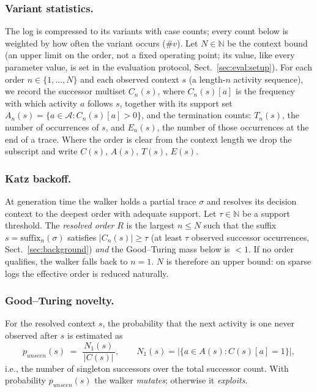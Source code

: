 \documentclass[runningheads]{llncs}
\newcommand{\punseen}{\ensuremath{p_{\mathit{unseen}}}}
\begin{document}
\subsubsection{Variant statistics.}
The log is compressed to its variants with case counts; every count below is weighted by how often the variant occurs ($\#v$). Let $N\in\mathbb{N}$ be the context bound (an upper limit on the order, not a fixed operating point; its value, like every parameter value, is set in the evaluation protocol, Sect.~\ref{sec:eval:setup}). For each order $n\in\{1,\dots,N\}$ and each observed context $s$ (a length-$n$ activity sequence), we record the successor multiset $C_n(s)$, where $C_n(s)[a]$ is the frequency with which activity $a$ follows $s$, together with its support set $A_n(s)=\{a\in\mathcal{A}:C_n(s)[a]>0\}$, and the termination counts: $T_n(s)$, the number of occurrences of $s$, and $E_n(s)$, the number of those occurrences at the end of a trace. Where the order is clear from the context length we drop the subscript and write $C(s)$, $A(s)$, $T(s)$, $E(s)$.

\subsubsection{Katz backoff.}
At generation time the walker holds a partial trace $\sigma$ and resolves its decision context to the deepest order with adequate support. Let $\tau\in\mathbb{N}$ be a support threshold. The \emph{resolved order} $R$ is the largest $n\le N$ such that the suffix $s=\mathrm{suffix}_n(\sigma)$ satisfies $|C_n(s)|\ge\tau$ (at least $\tau$ observed successor occurrences, Sect.~\ref{sec:background}) \emph{and} the Good--Turing mass below is $<1$. If no order qualifies, the walker falls back to $n{=}1$. $N$ is therefore an upper bound: on sparse logs the effective order is reduced naturally.

\subsubsection{Good--Turing novelty.}
For the resolved context $s$, the probability that the next activity is one never observed after $s$ is estimated as
\begin{equation}
\punseen(s) \;=\; \frac{N_1(s)}{\,|C(s)|\,}, \qquad N_1(s) = |\{a \in A(s) : C(s)[a]=1\}|,
\label{eq:gt}
\end{equation}
i.e., the number of singleton successors over the total successor count. With probability $\punseen(s)$ the walker \emph{mutates}; otherwise it \emph{exploits}.
\end{document}
